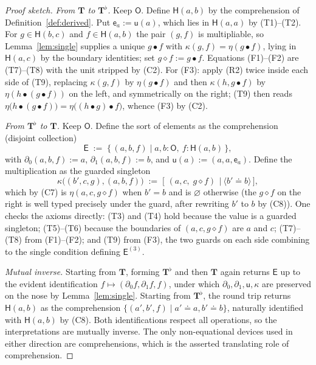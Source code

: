 \documentclass[11pt]{article}
\theoremstyle{definition}
\theoremstyle{plain}
\newcommand{\Ob}{\mathsf{O}}            %
\newcommand{\Ed}{\mathsf{E}}            %
\newcommand{\unit}{\eta}                %
\newcommand{\zero}{\varnothing}         %
\newcommand{\guard}[1]{\langle #1\rangle}
\newcommand{\eq}{\mathrel{\doteq}}      %
\newcommand{\dl}{\partial_{0}}          %
\newcommand{\dr}{\partial_{1}}          %
\newcommand{\uu}{\mathsf{u}}            %
\newcommand{\kk}{\kappa}                %
\newcommand{\Hom}{\mathsf{H}}           %
\newcommand{\co}{\mathbin{\diamond}}    %
\newcommand{\unitf}{\mathsf{e}}         %
\newcommand{\compr}[2]{\bigl[\,#1 \ \big|\ #2\,\bigr]}
\begin{document}
\begin{proof}[Proof sketch]
\emph{From $\mathbf{T}$ to $\mathbf{T}^{\flat}$.} Keep $\Ob$. Define
$\Hom(a,b)$ by the comprehension of Definition~\ref{def:derived}. Put
$\unitf_a:=\uu(a)$, which lies in $\Hom(a,a)$ by (T1)--(T2). For
$g\in\Hom(b,c)$ and $f\in\Hom(a,b)$ the pair $(g,f)$ is multipliable, so
Lemma~\ref{lem:single} supplies a unique $g\bullet f$ with
$\kk(g,f)=\unit(g\bullet f)$, lying in $\Hom(a,c)$ by the boundary identities;
set $g\co f:=g\bullet f$. Equations (F1)--(F2) are (T7)--(T8) with the unit
stripped by (C2). For (F3): apply (R2) twice inside each side of (T9),
replacing $\kk(g,f)$ by $\unit(g\bullet f)$ and then $\kk(h,g\bullet f)$ by
$\unit(h\bullet(g\bullet f))$ on the left, and symmetrically on the right; (T9)
then reads $\unit\bigl(h\bullet(g\bullet f)\bigr)=\unit\bigl((h\bullet g)\bullet
f\bigr)$, whence (F3) by (C2).

\emph{From $\mathbf{T}^{\flat}$ to $\mathbf{T}$.} Keep $\Ob$. Define the sort of
elements as the comprehension (disjoint collection)
\[
  \Ed \;:=\; \{\,(a,b,f) \mid a,b\colon\Ob,\ f\colon\Hom(a,b)\,\},
\]
with $\dl(a,b,f):=a$, $\dr(a,b,f):=b$, and $\uu(a):=(a,a,\unitf_a)$. Define the
multiplication as the guarded singleton
\[
  \kk\bigl((b',c,g),(a,b,f)\bigr)
   \;:=\;
   \compr{\,(a,c,\;g\co f)\,}{\guard{b'\eq b}},
\]
which by (C7) is $\unit(a,c,g\co f)$ when $b'=b$ and is $\zero$ otherwise (the
$g\co f$ on the right is well typed precisely under the guard, after rewriting
$b'$ to $b$ by (C8)). One checks the axioms directly: (T3) and (T4) hold because
the value is a guarded singleton; (T5)--(T6) because the boundaries of
$(a,c,g\co f)$ are $a$ and $c$; (T7)--(T8) from (F1)--(F2); and (T9) from (F3),
the two guards on each side combining to the single condition defining
$\Ed^{(3)}$.

\emph{Mutual inverse.} Starting from $\mathbf{T}$, forming $\mathbf{T}^{\flat}$
and then $\mathbf{T}$ again returns $\Ed$ up to the evident identification
$f\mapsto(\dl f,\dr f,f)$, under which $\dl,\dr,\uu,\kk$ are preserved on the
nose by Lemma~\ref{lem:single}. Starting from $\mathbf{T}^{\flat}$, the round
trip returns $\Hom(a,b)$ as the comprehension
$\{(a',b',f)\mid a'\eq a, b'\eq b\}$, naturally identified with $\Hom(a,b)$ by
(C8). Both identifications respect all operations, so the interpretations are
mutually inverse. The only non-equational devices used in either direction are
comprehensions, which is the asserted translating role of comprehension.
\end{proof}
\end{document}
